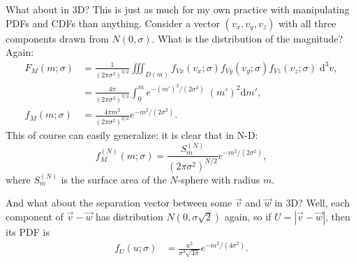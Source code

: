 \documentclass[12pt]{article}
\newcommand*{\abs}[1]{\left|#1\right|}
\newcommand*{\p}[1]{\left(#1\right)}
\begin{document}
What about in 3D\@? This is just as much for my own practice with manipulating
PDFs and CDFs than anything. Consider a vector $\p{v_x, v_y, v_z}$ with all
three components drawn from $N\p{0, \sigma}$. What is the distribution of the
magnitude? Again:
\begin{align}
    F_M(m; \sigma)
        &= \frac{1}{(2\pi \sigma^2)^{3/2}}\iiint_{D(m)}
            f_{Vx}\p{v_x; \sigma}
            f_{Vy}\p{v_y; \sigma}
            f_{Vz}\p{v_z; \sigma}\;\mathrm{d}^3v,\\
        &= \frac{4\pi}{(2\pi \sigma^2)^{3/2}}\int_0^m
            e^{-(m')^2/(2\sigma^2)}\;(m')^2\mathrm{d}m',\\
    f_M(m; \sigma) &= \frac{4\pi m^2}{\p{2\pi \sigma^2}^{3/2}}
            e^{-m^2/(2\sigma^2)}.
\end{align}
This of course can easily generalize: it is clear that in N-D\@:
\begin{equation}
    f^{(N)}_M(m; \sigma)
        = \frac{S^{(N)}_m}{\p{2\pi \sigma^2}^{N / 2}}
            e^{-m^2 / (2\sigma^2)},
\end{equation}
where $S^{(N)}_m$ is the surface area of the $N$-sphere with radius $m$.

And what about the separation vector between some $\vec{v}$ and $\vec{w}$ in
3D\@? Well, each component of $\vec{v} - \vec{w}$ has distribution $N\p{0,
\sigma \sqrt{2}}$ again, so if $U = \abs{\vec{v} - \vec{w}}$, then its PDF is
\begin{align}
    f_U(u; \sigma)
        &= \frac{u^2}{\sigma^3\sqrt{4\pi}}
            e^{-m^2 / (4\sigma^2)}.
\end{align}
\end{document}
